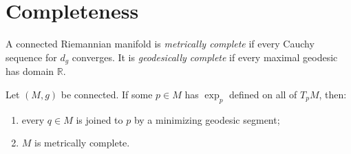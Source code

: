 \section{Completeness}

A connected Riemannian manifold is \emph{metrically complete} if every Cauchy
sequence for $d_g$ converges. It is \emph{geodesically complete} if every
maximal geodesic has domain $\mathbb R$.

\begin{lemma}
\label{lem:exponential-map-implies-completeness}




Let $(M,g)$ be connected. If some $p\in M$ has $\exp_p$ defined on all of
$T_pM$, then:
\begin{enumerate}
\item[(a)] every $q\in M$ is joined to $p$ by a minimizing geodesic segment;
\item[(b)] $M$ is metrically complete.
\end{enumerate}
\end{lemma}


